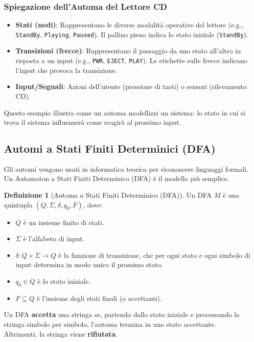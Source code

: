 \documentclass[a4paper]{article}
\theoremstyle{definition} %
\newtheorem{definition}{Definizione}
\begin{document}
\subsubsection{Spiegazione dell'Automa del Lettore CD}
\begin{itemize}
    \item \textbf{Stati (nodi)}: Rappresentano le diverse modalità operative del lettore (e.g., \texttt{StandBy}, \texttt{Playing}, \texttt{Paused}). Il pallino pieno indica lo stato iniziale (\texttt{StandBy}).
    \item \textbf{Transizioni (frecce)}: Rappresentano il passaggio da uno stato all'altro in risposta a un input (e.g., \texttt{PWR}, \texttt{EJECT}, \texttt{PLAY}). Le etichette sulle frecce indicano l'input che provoca la transizione.
    \item \textbf{Input/Segnali}: Azioni dell'utente (pressione di tasti) o sensori (rilevamento CD).
\end{itemize}
Questo esempio illustra come un automa modellizzi un sistema: lo stato in cui si trova il sistema influenzerà come reagirà al prossimo input.

\subsection{Automi a Stati Finiti Determinici (DFA)}
Gli automi vengono usati in informatica teorica per riconoscere linguaggi formali. Un Automaton a Stati Finiti Determinico (DFA) è il modello più semplice.

\begin{definition}[Automa a Stati Finiti Determinico (DFA)]
Un DFA $M$ è una quintupla $(Q, \Sigma, \delta, q_0, F)$, dove:
\begin{itemize}
    \item $Q$ è un insieme finito di stati.
    \item $\Sigma$ è l'alfabeto di input.
    \item $\delta: Q \times \Sigma \to Q$ è la funzione di transizione, che per ogni stato e ogni simbolo di input determina in modo unico il prossimo stato.
    \item $q_0 \in Q$ è lo stato iniziale.
    \item $F \subseteq Q$ è l'insieme degli stati finali (o accettanti).
\end{itemize}
\end{definition}

Un DFA \textbf{accetta} una stringa se, partendo dallo stato iniziale e processando la stringa simbolo per simbolo, l'automa termina in uno stato accettante. Altrimenti, la stringa viene \textbf{rifiutata}.
\end{document}
